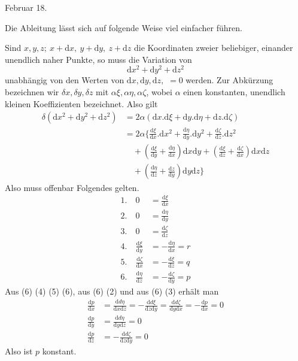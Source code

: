  Februar 18.

Die Ableitung lässt sich auf folgende Weise viel einfacher führen.

Sind $x,y,z;\ x+\mathrm dx,\ y+\mathrm dy,\ z+\mathrm dz$ die Koordinaten zweier beliebiger, einander unendlich naher Punkte, so muss die Variation von
\[
\mathrm dx^2+\mathrm dy^2+\mathrm dz^2
\]
unabhängig von den Werten von $\mathrm dx,\mathrm dy,\mathrm dz,$ $=0$ werden. Zur Abkürzung bezeichnen wir $\delta x,\delta y,\delta z$ mit $\alpha\xi,\alpha\eta,\alpha\zeta$, wobei $\alpha$ einen konstanten, unendlich kleinen Koeffizienten bezeichnet. Also gilt
\[
\begin{aligned}
\delta(\mathrm dx^2+\mathrm dy^2+\mathrm dz^2)&=2\alpha(\mathrm dx.\mathrm d\xi+\mathrm dy.\mathrm d\eta+\mathrm dz.\mathrm d\zeta)\\
&=2\alpha\Big\{\frac{\mathrm d\xi}{\mathrm dx}.\mathrm dx^2+\frac{\mathrm d\eta}{\mathrm dy}.\mathrm dy^2+\frac{\mathrm d\zeta}{\mathrm dz}.\mathrm dz^2\\
&\quad+\left(\frac{\mathrm d\xi}{\mathrm dy}+\frac{\mathrm d\eta}{\mathrm dx}\right)\mathrm dx\mathrm dy+\left(\frac{\mathrm d\xi}{\mathrm dz}+\frac{\mathrm d\zeta}{\mathrm dx}\right)\mathrm dx\mathrm dz\\
&\quad+\left(\frac{\mathrm d\eta}{\mathrm dz}+\frac{\mathrm dz}{\mathrm dy}\right)\mathrm dy\mathrm dz\Big\}
\end{aligned}
\]
Also muss offenbar Folgendes gelten.
\[
\begin{aligned}
1.\quad0&=\frac{\mathrm d\xi}{\mathrm dx}\\
2.\quad0&=\frac{\mathrm d\eta}{\mathrm dy}\\
3.\quad0&=\frac{\mathrm d\zeta}{\mathrm dz}\\
4.\quad\frac{\mathrm d\xi}{\mathrm dy}&=-\frac{\mathrm d\eta}{\mathrm dx}=r\\
5.\quad\frac{\mathrm d\zeta}{\mathrm dx}&=-\frac{\mathrm d\xi}{\mathrm dz}=q\\
6.\quad\frac{\mathrm d\eta}{\mathrm dz}&=-\frac{\mathrm d\zeta}{\mathrm dy}=p
\end{aligned}
\]
Aus (6) (4) (5) (6), aus (6) (2) und aus (6) (3) erhält man
\[
\begin{aligned}
\frac{\mathrm dp}{\mathrm dx}&=\frac{\mathrm dd\eta}{\mathrm dx\mathrm dz}=-\frac{\mathrm dd\xi}{\mathrm dz\mathrm dy}=\frac{\mathrm dd\zeta}{\mathrm dy\mathrm dx}=-\frac{\mathrm dp}{\mathrm dx}=0\\
\frac{\mathrm dp}{\mathrm dy}&=\frac{\mathrm dd\eta}{\mathrm dy\mathrm dz}=0\\
\frac{\mathrm dp}{\mathrm dz}&=-\frac{\mathrm dd\zeta}{\mathrm dz\mathrm dy}=0
\end{aligned}
\]
Also ist $p$ konstant.

